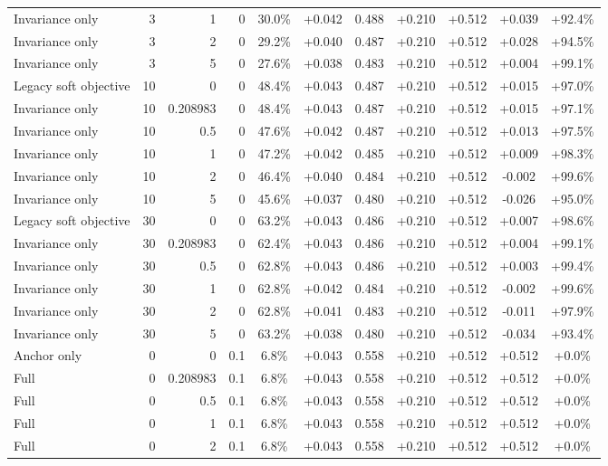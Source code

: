\begin{table}[htbp]
\begin{tabular}{lrrrccccccc}
Invariance only & 3 & 1 & 0 & 30.0\% & +0.042 & 0.488 & +0.210 & +0.512 & +0.039 & +92.4\% \\
Invariance only & 3 & 2 & 0 & 29.2\% & +0.040 & 0.487 & +0.210 & +0.512 & +0.028 & +94.5\% \\
Invariance only & 3 & 5 & 0 & 27.6\% & +0.038 & 0.483 & +0.210 & +0.512 & +0.004 & +99.1\% \\
Legacy soft objective & 10 & 0 & 0 & 48.4\% & +0.043 & 0.487 & +0.210 & +0.512 & +0.015 & +97.0\% \\
Invariance only & 10 & 0.208983 & 0 & 48.4\% & +0.043 & 0.487 & +0.210 & +0.512 & +0.015 & +97.1\% \\
Invariance only & 10 & 0.5 & 0 & 47.6\% & +0.042 & 0.487 & +0.210 & +0.512 & +0.013 & +97.5\% \\
Invariance only & 10 & 1 & 0 & 47.2\% & +0.042 & 0.485 & +0.210 & +0.512 & +0.009 & +98.3\% \\
Invariance only & 10 & 2 & 0 & 46.4\% & +0.040 & 0.484 & +0.210 & +0.512 & -0.002 & +99.6\% \\
Invariance only & 10 & 5 & 0 & 45.6\% & +0.037 & 0.480 & +0.210 & +0.512 & -0.026 & +95.0\% \\
Legacy soft objective & 30 & 0 & 0 & 63.2\% & +0.043 & 0.486 & +0.210 & +0.512 & +0.007 & +98.6\% \\
Invariance only & 30 & 0.208983 & 0 & 62.4\% & +0.043 & 0.486 & +0.210 & +0.512 & +0.004 & +99.1\% \\
Invariance only & 30 & 0.5 & 0 & 62.8\% & +0.043 & 0.486 & +0.210 & +0.512 & +0.003 & +99.4\% \\
Invariance only & 30 & 1 & 0 & 62.8\% & +0.042 & 0.484 & +0.210 & +0.512 & -0.002 & +99.6\% \\
Invariance only & 30 & 2 & 0 & 62.8\% & +0.041 & 0.483 & +0.210 & +0.512 & -0.011 & +97.9\% \\
Invariance only & 30 & 5 & 0 & 63.2\% & +0.038 & 0.480 & +0.210 & +0.512 & -0.034 & +93.4\% \\
Anchor only & 0 & 0 & 0.1 & 6.8\% & +0.043 & 0.558 & +0.210 & +0.512 & +0.512 & +0.0\% \\
Full & 0 & 0.208983 & 0.1 & 6.8\% & +0.043 & 0.558 & +0.210 & +0.512 & +0.512 & +0.0\% \\
Full & 0 & 0.5 & 0.1 & 6.8\% & +0.043 & 0.558 & +0.210 & +0.512 & +0.512 & +0.0\% \\
Full & 0 & 1 & 0.1 & 6.8\% & +0.043 & 0.558 & +0.210 & +0.512 & +0.512 & +0.0\% \\
Full & 0 & 2 & 0.1 & 6.8\% & +0.043 & 0.558 & +0.210 & +0.512 & +0.512 & +0.0\% \\

\end{tabular}
\end{table}
